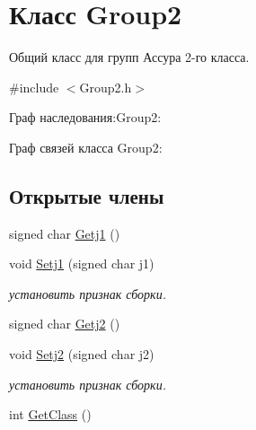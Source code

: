 \hypertarget{class_group2}{
\section{Класс Group2}
\label{class_group2}
}


Общий класс для групп Ассура 2-\/го класса.  




{\ttfamily \#include $<$Group2.h$>$}



Граф наследования:Group2:


Граф связей класса Group2:
\subsection*{Открытые члены}
\begin{DoxyCompactItemize}
\item 
signed char \hyperlink{class_group2_ae303e8a5b1c3d928af31ebbac5dcc24f}{Getj1} ()
\item 
\hypertarget{class_group2_a128fe0d0715b3fccb22e32d7f5f459e4}{
void \hyperlink{class_group2_a128fe0d0715b3fccb22e32d7f5f459e4}{Setj1} (signed char j1)}
\label{class_group2_a128fe0d0715b3fccb22e32d7f5f459e4}

\begin{DoxyCompactList}\small\item\em установить признак сборки. \item\end{DoxyCompactList}\item 
signed char \hyperlink{class_group2_ae580d1aed874c9dfb8a49a92937fd66b}{Getj2} ()
\item 
\hypertarget{class_group2_a167cf2416aef44249803febdcfebf8f6}{
void \hyperlink{class_group2_a167cf2416aef44249803febdcfebf8f6}{Setj2} (signed char j2)}
\label{class_group2_a167cf2416aef44249803febdcfebf8f6}

\begin{DoxyCompactList}\small\item\em установить признак сборки. \item\end{DoxyCompactList}\item 
int \hyperlink{class_group2_aea85d48c1e5029d7e4c2d92d91a32327}{GetClass} ()
\end{DoxyCompactItemize}
